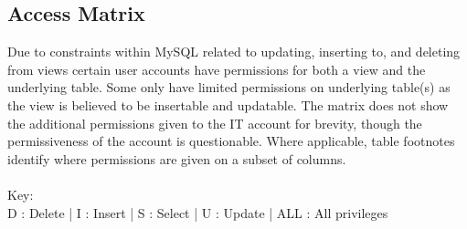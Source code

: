 \documentclass[a4paper, titlepage]{article}
\begin{document}
\pagebreak
\subsection{Access Matrix}
Due to constraints within MySQL related to updating, inserting to, and deleting from views certain user accounts have permissions for both a view and the underlying table. Some only have limited permissions on underlying table(s) as the view is believed to be insertable and updatable. The matrix does not show the additional permissions given to the IT account for brevity, though the permissiveness of the account is questionable. Where applicable, table footnotes identify where permissions are given on a subset of columns.
\\ \\
Key: \\
D : Delete | I : Insert | S : Select | U : Update | ALL : All privileges
\\
\end{document}
